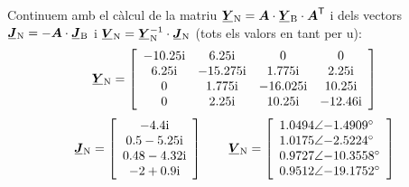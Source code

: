 \begin{exemple}
    Continuem amb el càlcul de la matriu $\mcmplx{Y}\ped{N} =
    \boldsymbol{A} \cdot \mcmplx{Y}\ped{B} \cdot \transpose{\boldsymbol{A}}$ i dels
    vectors $\mcmplx{J}\ped{N} = - \boldsymbol{A} \cdot \mcmplx{J}\ped{B}$ i
    $\mcmplx{V}\ped{N} = \mcmplx{Y}\ped{N}^{-1} \cdot \mcmplx{J}\ped{N}$ (tots
    els valors en tant per u):
    \[
       \mcmplx{Y}\ped{N} =
       \begin{bmatrix}\begin{array}{cccc}
         \complexnum{-j 10,25} & \complexnum{j 6,25} & 0 & 0 \\
         \complexnum{j 6,25} & \complexnum{-j 15,275} & \complexnum{j 1,775} & \complexnum{j 2,25} \\
         0 & \complexnum{j 1,775 }& \complexnum{-j 16,025} & \complexnum{j 10,25} \\
         0 & \complexnum{j 2,25} & \complexnum{j 10,25} & \complexnum{-j 12,46}
       \end{array}\end{bmatrix}
    \]
    \qquad
    \[
       \mcmplx{J}\ped{N} =
       \begin{bmatrix}\begin{array}{c}
        \complexnum{-j 4,4} \\
        \complexnum{0,5 - j 5,25} \\
       \complexnum{ 0,48 - j 4,32} \\
        \complexnum{-2 + j 0,9}
       \end{array}\end{bmatrix}
       \qquad
       \mcmplx{V}\ped{N} =
       \begin{bmatrix}\begin{array}{l}
        \complexnum{1,0494:-1,4909} \\
        \complexnum{1,0175:-2,5224} \\
        \complexnum{0,9727:-10,3558} \\
        \complexnum{0,9512:-19,1752}
       \end{array}\end{bmatrix}
    \]


\end{exemple}

